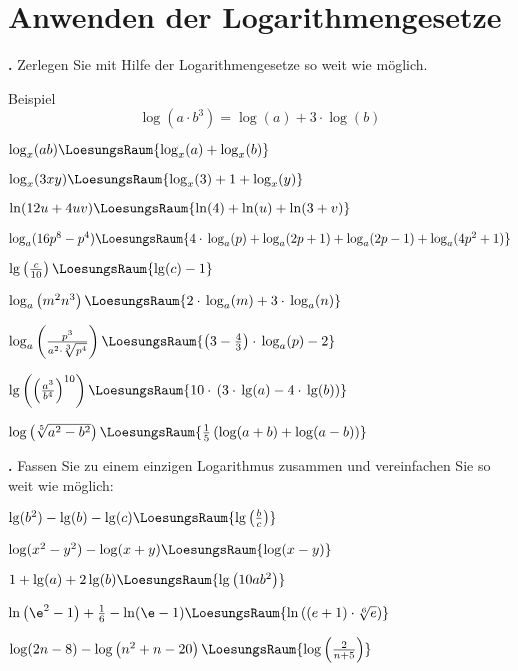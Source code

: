 \newpage

\section{Anwenden der Logarithmengesetze}

\textbf{\bbwAufgabenNummer{}.}
Zerlegen Sie mit Hilfe der Logarithmengesetze so weit wie möglich.

Beispiel $$\log\left(a\cdot{}b^3\right) = \log(a) + 3\cdot{}\log(b)$$

\begin{bbwAufgabenBlock}
\item $\log_x(ab)  \LoesungsRaum{\log_x(a) + \log_x(b)}$
\item $\log_x(3xy)  \LoesungsRaum{\log_x(3) + 1 + \log_x(y)}$
\item $\ln(12u+4uv)  \LoesungsRaum{\ln(4) + \ln(u) + \ln(3+v)}$
\item $\log_a(16p^8-p^4) \LoesungsRaum{4\cdot{}\log_a(p)+ \log_a(2p+1) + \log_a(2p-1)+ \log_a(4p^2+1)}$
\noTRAINER{\newpage}

\item $\lg\left(\frac{c}{10}\right)  \LoesungsRaum{\lg(c) - 1}$
\item $\log_a\left( m^2n^3 \right)  \LoesungsRaum{2\cdot{}\log_a(m) + 3\cdot{}\log_a(n)}$
\item $\log_a\left( \frac{p^3}{a^2 \cdot{} \sqrt[3]{p^4}} \right)  \LoesungsRaum{\left(3-\frac43\right)\cdot{}\log_a(p)- 2}$
\item
$\lg\left(\left(\frac{a^3}{b^4}\right)^{10}\right)  \LoesungsRaum{10\cdot{}\left(3 \cdot{}\lg(a) - 4\cdot{} \lg(b)\right)}$
\noTRAINER{\newpage}

\item $\log \left( \sqrt[5]{a^2-b^2}\right)  \LoesungsRaum{\frac15\left(\log(a+b) + \log(a-b)\right)}$

\end{bbwAufgabenBlock}

\newpage


\textbf{\bbwAufgabenNummer{}.}
Fassen Sie zu einem einzigen Logarithmus zusammen und vereinfachen Sie
so weit wie möglich:

\begin{bbwAufgabenBlock}
\item $\lg(b^2) - \lg(b) - \lg(c) \LoesungsRaum{\lg\left(\frac{b}c\right)}$
\item $\log(x^2-y^2) - \log(x+y) \LoesungsRaum{\log(x-y)}$
\item $1+\lg(a)+2\lg(b)  \LoesungsRaum{\lg\left( 10ab^2 \right)}$
\item $\ln\left(\e^2-1\right) + \frac16 - \ln(\e-1) \LoesungsRaum{\ln\left((e+1)\cdot{}\sqrt[6]{e}\right)}$
\item $\log(2n-8) - \log\left(n^2+n-20\right) \LoesungsRaum{\log\left(\frac{2}{n+5}\right)}$

\end{bbwAufgabenBlock}



\platzFuerBerechnungenBisEndeSeite{}%
%
